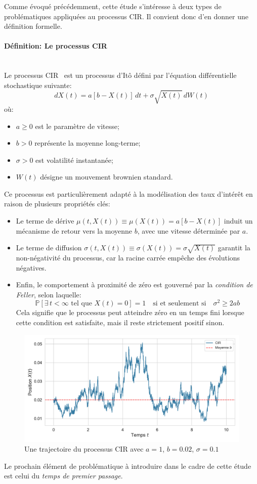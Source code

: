 Comme évoqué précédemment, cette étude s'intéresse à deux types de problématiques appliquées au processus \acl{CIR}. Il convient donc d'en donner une définition formelle.
\paragraph{Définition: Le processus \acl{CIR}}\mbox{}\\
Le processus \ac{CIR}~\cite{cox1985} est un processus d'Itô défini par l'équation différentielle stochastique suivante:
\begin{equation}
    dX(t) = a[b - X(t)]\,dt + \sigma \sqrt{X(t)}\,dW(t)
\end{equation}\label{cir_eq}
où:
\begin{itemize}
    \item $a \geq 0$ est le paramètre de vitesse;
    \item $b > 0$ représente la moyenne long-terme;
    \item $\sigma > 0$ est volatilité instantanée;
    \item $W(t)$ désigne un mouvement brownien standard.
\end{itemize}
Ce processus est particulièrement adapté à la modélisation des taux d'intérêt en raison de plusieurs propriétés clés:
\begin{itemize}
    \item Le terme de dérive $\mu(t, X(t)) \equiv \mu(X(t))= a[b - X(t)]$ induit un mécanisme de retour vers la moyenne $b$, avec une vitesse déterminée par $a$.
    \item Le terme de diffusion $\sigma(t, X(t))\equiv \sigma(X(t)) = \sigma \sqrt{X(t)}$ garantit la non-négativité du processus, car la racine carrée empêche des évolutions négatives.
    \item Enfin, le comportement à proximité de zéro est gouverné par la \textit{condition de Feller}, selon laquelle:
    \[
    \mathds{P} \left[ \exists\, t < \infty \text{ tel que } X(t) = 0 \right] = 1 \quad \text{si et seulement si} \quad \sigma^2 \geq 2ab
    \]
    Cela signifie que le processus peut atteindre zéro en un temps fini lorsque cette condition est satisfaite, mais il reste strictement positif sinon.
\end{itemize}
\begin{figure}[htb]
    \centering
    \includegraphics[width=0.9\linewidth]{img/intro/path_cir.pdf}
    \caption{Une trajectoire du processus \acs{CIR} avec $a=1$, $b=0.02$, $\sigma=0.1$}\label{fig:TrajCIR}
\end{figure}
\FloatBarrier Le prochain élément de problématique à introduire dans le cadre de cette étude est celui du \textit{temps de premier passage}.

